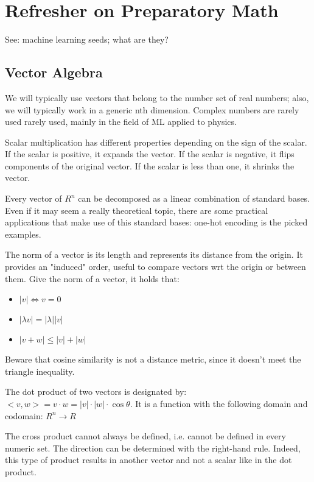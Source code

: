 \chapter{Refresher on Preparatory Math}

See: machine learning seeds; what are they?

\section{Vector Algebra}
We will typically use vectors that belong to the number set of real numbers; also, we will typically work in a generic nth dimension.
Complex numbers are rarely used rarely used, mainly in the field of ML applied to physics.

Scalar multiplication has different properties depending on the sign of the scalar.
If the scalar is positive, it expands the vector.
If the scalar is negative, it flips components of the original vector.
If the scalar is less than one, it shrinks the vector.

Every vector of $R^n$ can be decomposed as a linear combination of standard bases.
Even if it may seem a really theoretical topic, there are some practical applications that make use of this standard bases: one-hot encoding is the picked examples.

The norm of a vector is its length and represents its distance from the origin. It provides an "induced" order, useful to compare vectors wrt the origin or between them.
Give the norm of a vector, it holds that:
\begin{itemize}
  \item $|v| \Leftrightarrow v=0$
  \item $|\lambda v| = |\lambda| |v|$
  \item $|v + w| \leq |v| + |w|$
\end{itemize}

Beware that cosine similarity is not a distance metric, since it doesn't meet the triangle inequality.

The dot product of two vectors is designated by: $<v, w> = v \cdot w = |v| \cdot |w| \cdot \cos \theta$.
It is a function with the following domain and codomain: $R^n \rightarrow R$

The cross product cannot always be defined, i.e. cannot be defined in every numeric set. The direction can be determined with the right-hand rule.
Indeed, this type of product results in another vector and not a scalar like in the dot product.

